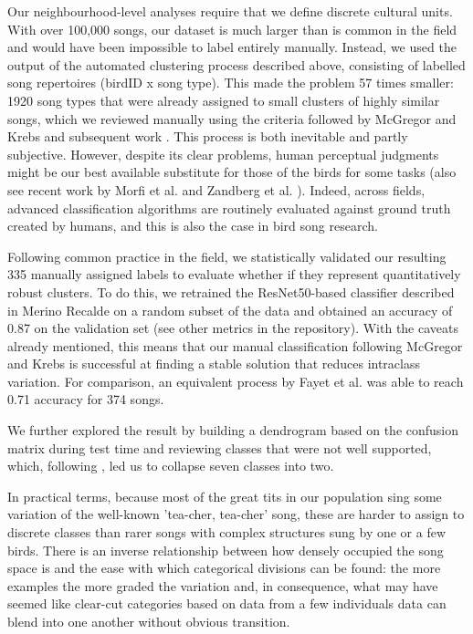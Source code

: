 \documentclass[9pt, onecolumn, twoside, lineno]{gsajnl}
\begin{document}
Our neighbourhood-level analyses require that we define discrete cultural units. With over 100,000 songs, our dataset is much larger than is common in the field and would have been impossible to label entirely manually. Instead, we used the output of the automated clustering process described above, consisting of labelled song repertoires (birdID x song type). This made the problem 57 times smaller: 1920 song types that were already assigned to small clusters of highly similar songs, which we reviewed manually using the criteria followed by McGregor and Krebs \autocite{mcgregor1982b, mcgregor1982, mcgregor1981} and subsequent work \autocite{baker1987, falls1982, fayet2014, hutfluss2022}.
This process is both inevitable and partly subjective. However, despite its clear problems, human perceptual judgments might be our best available substitute for those of the birds for some tasks (also see recent work by Morfi et al. \autocite{morfi2021} and  Zandberg et al. \autocite{zandberg2022}). Indeed, across fields, advanced classification algorithms are routinely evaluated against ground truth created by humans, and this is also the case in bird song research.

Following common practice in the field, we statistically validated our resulting 335 manually assigned labels to evaluate whether if they represent quantitatively robust clusters. To do this, we retrained the ResNet50-based classifier described in Merino Recalde \autocite{merinorecalde2023} on a random subset of the data and obtained an accuracy of 0.87 on the validation set (see other metrics in the repository). With the caveats already mentioned, this means that our manual classification following McGregor and Krebs \autocite{mcgregor1982b} is successful at finding a stable solution that reduces intraclass variation. For comparison, an equivalent process by Fayet et al. \autocite{fayet2014} was able to reach 0.71 accuracy for 374 songs.

We further explored the result by building a dendrogram based on the confusion matrix during test time and reviewing classes that were not well supported, which, following  \autocite{fayet2014}, led us to collapse seven classes into two.

In practical terms, because most of the great tits in our population sing some variation of the well-known 'tea-cher, tea-cher' song, these are harder to assign to discrete classes than rarer songs with complex structures sung by one or a few birds. There is an inverse relationship between how densely occupied the song space is and the ease with which categorical divisions can be found: the more examples the more graded the variation and, in consequence, what may have seemed like clear-cut categories based on data from a few individuals data can blend into one another without obvious transition.
\end{document}
